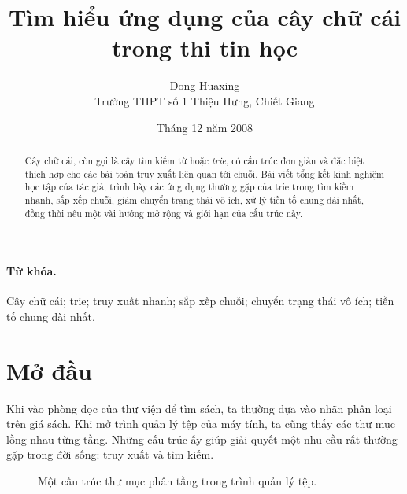 \documentclass[11pt]{article}
\title{Tìm hiểu ứng dụng của cây chữ cái trong thi tin học}
\author{Dong Huaxing\\Trường THPT số 1 Thiệu Hưng, Chiết Giang}
\date{Tháng 12 năm 2008}
\begin{document}
\maketitle


\begin{abstract}
Cây chữ cái, còn gọi là cây tìm kiếm từ hoặc \textit{trie}, có cấu trúc đơn
giản và đặc biệt thích hợp cho các bài toán truy xuất liên quan tới chuỗi. Bài
viết tổng kết kinh nghiệm học tập của tác giả, trình bày các ứng dụng thường
gặp của trie trong tìm kiếm nhanh, sắp xếp chuỗi, giảm chuyển trạng thái vô
ích, xử lý tiền tố chung dài nhất, đồng thời nêu một vài hướng mở rộng và giới
hạn của cấu trúc này.
\end{abstract}

\paragraph{Từ khóa.}
Cây chữ cái; trie; truy xuất nhanh; sắp xếp chuỗi; chuyển trạng thái vô ích;
tiền tố chung dài nhất.

\tableofcontents

\section{Mở đầu}

Khi vào phòng đọc của thư viện để tìm sách, ta thường dựa vào nhãn phân loại
trên giá sách. Khi mở trình quản lý tệp của máy tính, ta cũng thấy các thư
mục lồng nhau từng tầng. Những cấu trúc ấy giúp giải quyết một nhu cầu rất
thường gặp trong đời sống: truy xuất và tìm kiếm.

\begin{figure}[htbp]
\centering
{}
\caption{Một cấu trúc thư mục phân tầng trong trình quản lý tệp.}
\end{figure}
\end{document}
